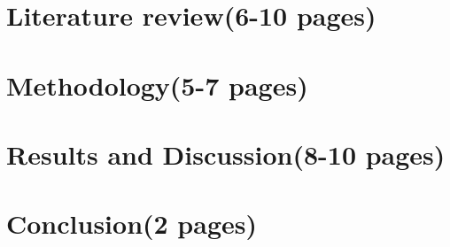 \documentclass[12pt, openany]{book}
\begin{document}
\chapter{Literature review(6-10 pages)}



\chapter{Methodology(5-7 pages)}


\chapter{Results and Discussion(8-10 pages)}



\chapter{Conclusion(2 pages)}




\newpage
{}
\begin{appendices}
\end{appendices}
\end{document}
